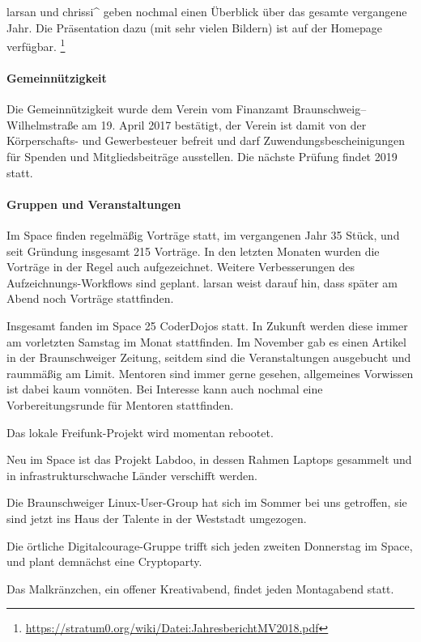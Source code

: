 \documentclass{s0minutes}
\begin{document}
larsan und chrissi\^{} geben nochmal einen Überblick über das gesamte vergangene
Jahr. Die Präsentation dazu (mit sehr vielen Bildern) ist auf der Homepage
verfügbar.%
\footnote{\url{https://stratum0.org/wiki/Datei:JahresberichtMV2018.pdf}}

\paragraph{Gemeinnützigkeit}

Die Gemeinnützigkeit wurde dem Verein vom Finanzamt Braunschweig--Wilhelmstraße
am 19. April 2017 bestätigt, der Verein ist damit von der Körperschafts- und
Gewerbesteuer befreit und darf Zuwendungsbescheinigungen für Spenden und
Mitglieds\-beiträge ausstellen.  Die nächste Prüfung findet 2019 statt.

\paragraph{Gruppen und Veranstaltungen}

Im Space finden regelmäßig Vorträge statt, im vergangenen Jahr 35 Stück, und
seit Gründung insgesamt 215 Vorträge. In den letzten Monaten wurden die
Vorträge in der Regel auch aufgezeichnet. Weitere Verbesserungen des
Aufzeichnungs-Workflows sind geplant. larsan weist darauf hin, dass später am
Abend noch Vorträge stattfinden.

Insgesamt fanden im Space 25 CoderDojos statt. In Zukunft werden diese immer am
vorletzten Samstag im Monat stattfinden. Im November gab es einen Artikel
in der Braunschweiger Zeitung, seitdem sind die Veranstaltungen ausgebucht und
raummäßig am Limit. Mentoren sind immer gerne gesehen, allgemeines Vorwissen ist
dabei kaum vonnöten. Bei Interesse kann auch nochmal eine Vorbereitungsrunde für
Mentoren stattfinden.

Das lokale Freifunk-Projekt wird momentan rebootet.

Neu im Space ist das Projekt Labdoo, in dessen Rahmen Laptops gesammelt und in
infrastrukturschwache Länder verschifft werden.

Die Braunschweiger Linux-User-Group hat sich im Sommer bei uns getroffen, sie
sind jetzt ins Haus der Talente in der Weststadt umgezogen.

Die örtliche Digitalcourage-Gruppe trifft sich jeden zweiten Donnerstag im
Space, und plant demnächst eine Cryptoparty.

Das Malkränzchen, ein offener Kreativabend, findet jeden Montagabend statt.
\end{document}
